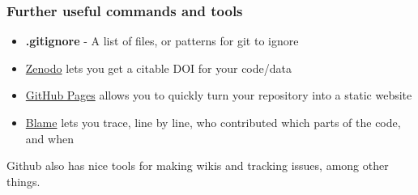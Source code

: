 \documentclass{beamer}
\newcommand{\code}[1]{{\fontfamily{pcr}\selectfont \textbf{#1}}}
\begin{document}
\begin{frame}


\end{frame}

\begin{frame}
\frametitle{Further useful commands and tools}

\begin{itemize}
	\item \code{.gitignore} - A list of files, or patterns for git to ignore
	\item \href{https://guides.github.com/activities/citable-code/}{Zenodo} lets you get a citable DOI for your code/data
	\item \href{https://guides.github.com/features/pages/}{GitHub Pages} allows you to quickly turn your repository into a static website
	\item \href{https://github.com/mcc-apsis/git-intro/blame/master/slides/presentation.tex}{Blame} lets you trace, line by line, who contributed which parts of the code, and when
	
\end{itemize}

Github also has nice tools for making wikis and tracking issues, among other things.




\end{frame}
\end{document}
